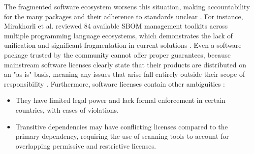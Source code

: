 The fragmented software ecosystem worsens this situation, making accountability for the many packages and their adherence to standards unclear \cite{williams2025enabling}. For instance, Mirakhorli et al. reviewed 84 available SBOM management toolkits across multiple programming language ecosystems, which demonstrates the lack of unification and significant fragmentation in current solutions \cite{mirakhorli2024landscape}. Even a software package trusted by the community cannot offer proper guarantees, because mainstream software licenses clearly state that their products are distributed on an "as is" basis, meaning any issues that arise fall entirely outside their scope of responsibility \cite[pp. 2–3]{cox2019surviving}. Furthermore, software licenses contain other ambiguities \cite{wintersgill2024law}:
\begin{itemize}
    \item They have limited legal power and lack formal enforcement in certain countries, with cases of violations.
    \item Transitive dependencies may have conflicting licenses compared to the primary dependency, requiring the use of scanning tools to account for overlapping permissive and restrictive licenses.
\end{itemize}

